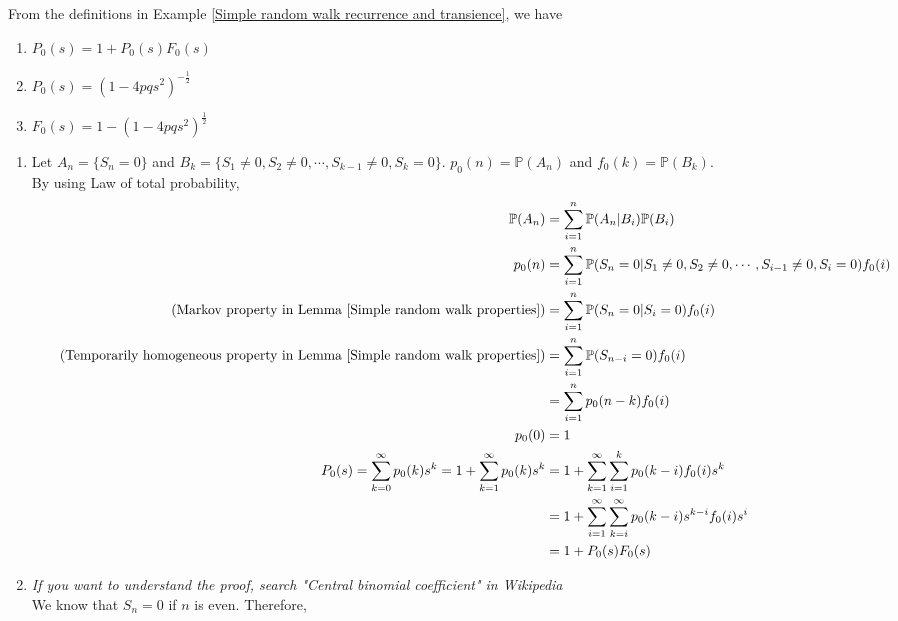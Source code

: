 \documentclass{huhtakm-template-book}
\newcommand{\prob}{\mathbb{P}}
\begin{document}
\begin{thm}
    \label{Chapter 5 Theorem Simple random walk particle return generating function}
    From the definitions in Example \ref{Simple random walk recurrence and transience}, we have
    \begin{enumerate}
        \item $P_{0}(s)=1+P_{0}(s)F_{0}(s)$
        \item $P_{0}(s)=(1-4pqs^{2})^{-\frac{1}{2}}$
        \item $F_{0}(s)=1-(1-4pqs^{2})^{\frac{1}{2}}$
    \end{enumerate}
\end{thm}
\newpage
\begin{proofing}
    \begin{enumerate}
        \item Let $A_{n}=\{S_{n}=0\}$ and $B_{k}=\{S_{1}\neq 0,S_{2}\neq 0,\cdots,S_{k-1}\neq 0,S_{k}=0\}$. $p_{0}(n)=\prob(A_{n})$ and $f_{0}(k)=\prob(B_{k})$.\\
        By using Law of total probability, 
        \begin{align*}
            \prob(A_{n})&=\sum_{i=1}^{n}\prob(A_{n}|B_{i})\prob(B_{i})\\
            p_{0}(n)&=\sum_{i=1}^{n}\prob(S_{n}=0|S_{1}\neq 0,S_{2}\neq 0,\cdots,S_{i-1}\neq 0,S_{i}=0)f_{0}(i)\\
            \tag{Markov property in Lemma \ref{Simple random walk properties}}
            &=\sum_{i=1}^{n}\prob(S_{n}=0|S_{i}=0)f_{0}(i)\\
            \tag{Temporarily homogeneous property in Lemma \ref{Simple random walk properties}}
            &=\sum_{i=1}^{n}\prob(S_{n-i}=0)f_{0}(i)\\
            &=\sum_{i=1}^{n}p_{0}(n-k)f_{0}(i)\\
            p_{0}(0)&=1\\
            P_{0}(s)=\sum_{k=0}^{\infty}p_{0}(k)s^{k}=1+\sum_{k=1}^{\infty}p_{0}(k)s^{k}&=1+\sum_{k=1}^{\infty}\sum_{i=1}^{k}p_{0}(k-i)f_{0}(i)s^{k}\\
            &=1+\sum_{i=1}^{\infty}\sum_{k=i}^{\infty}p_{0}(k-i)s^{k-i}f_{0}(i)s^{i}\\
            &=1+P_{0}(s)F_{0}(s)
        \end{align*}
        \item \textit{If you want to understand the proof, search "Central binomial coefficient" in Wikipedia}\\
        We know that $S_{n}=0$ if $n$ is even. Therefore,

\end{enumerate}
\end{proofing}
\end{document}

